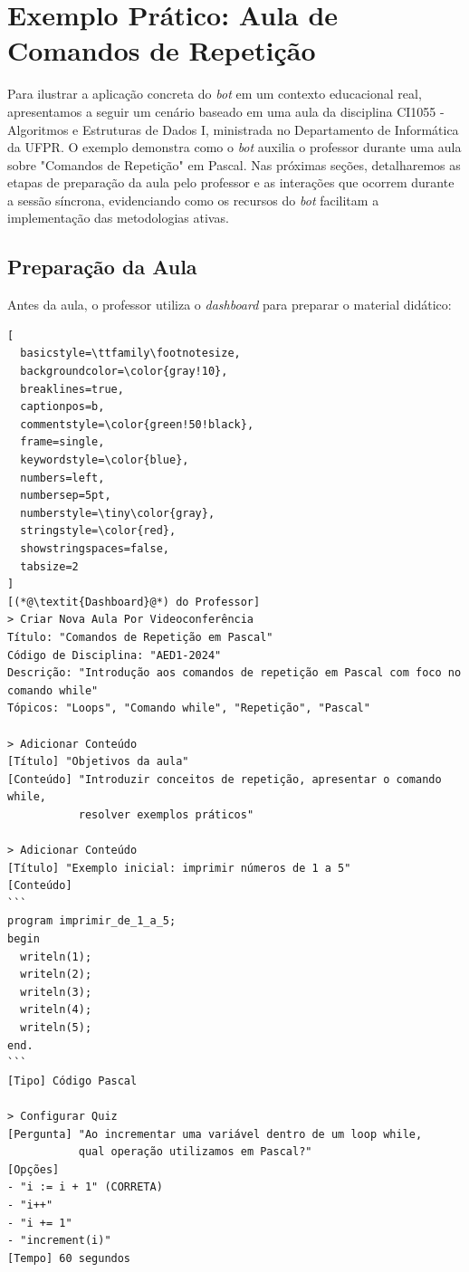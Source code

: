 \section{Exemplo Prático: Aula de Comandos de Repetição}
\label{sec:exemplo}

Para ilustrar a aplicação concreta do \textit{bot} em um contexto educacional
real, apresentamos a seguir um cenário baseado em uma aula da disciplina CI1055
- Algoritmos e Estruturas de Dados I, ministrada no Departamento de Informática
da UFPR. O exemplo demonstra como o \textit{bot} auxilia o professor durante uma
aula sobre "Comandos de Repetição" em Pascal. Nas próximas seções, detalharemos
as etapas de preparação da aula pelo professor e as interações que ocorrem
durante a sessão síncrona, evidenciando como os recursos do \textit{bot}
facilitam a implementação das metodologias ativas.

\subsection{Preparação da Aula}
\label{subsec:preparacao}

Antes da aula, o professor utiliza o \textit{dashboard} para preparar o material
didático:

\begin{lstlisting}[
  basicstyle=\ttfamily\footnotesize,
  backgroundcolor=\color{gray!10},
  breaklines=true,
  captionpos=b,
  commentstyle=\color{green!50!black},
  frame=single,
  keywordstyle=\color{blue},
  numbers=left,
  numbersep=5pt,
  numberstyle=\tiny\color{gray},
  stringstyle=\color{red},
  showstringspaces=false,
  tabsize=2
]
[(*@\textit{Dashboard}@*) do Professor]
> Criar Nova Aula Por Videoconferência
Título: "Comandos de Repetição em Pascal"
Código de Disciplina: "AED1-2024"
Descrição: "Introdução aos comandos de repetição em Pascal com foco no comando while"
Tópicos: "Loops", "Comando while", "Repetição", "Pascal"

> Adicionar Conteúdo
[Título] "Objetivos da aula"
[Conteúdo] "Introduzir conceitos de repetição, apresentar o comando while, 
           resolver exemplos práticos"

> Adicionar Conteúdo
[Título] "Exemplo inicial: imprimir números de 1 a 5"
[Conteúdo] 
```
program imprimir_de_1_a_5;
begin
  writeln(1);
  writeln(2);
  writeln(3);
  writeln(4);
  writeln(5);
end.
```
[Tipo] Código Pascal

> Configurar Quiz
[Pergunta] "Ao incrementar uma variável dentro de um loop while, 
           qual operação utilizamos em Pascal?"
[Opções] 
- "i := i + 1" (CORRETA)
- "i++"
- "i += 1"
- "increment(i)"
[Tempo] 60 segundos
\end{lstlisting}

